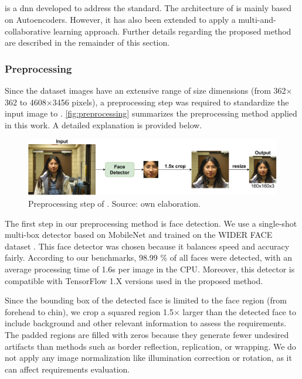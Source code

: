 \subsection{\methodname}
 
\methodname is a \acl{dnn} developed to address the \icao standard. The architecture of \methodname is mainly based on Autoencoders. However, it has also been extended to apply a multi-and-collaborative learning approach. Further details regarding the proposed method are described in the remainder of this section. 
 
\subsubsection{Preprocessing} \label{sec:preprocessing}
 
Since the \adhoc dataset images have an extensive range of size dimensions (from 362$\times$362 to 4608$\times$3456 pixels), a preprocessing step was required to standardize the input image to \methodname. \autoref{fig:preprocessing} summarizes the preprocessing method applied in this work. A detailed explanation is provided below.
 
\begin{figure}[tb]
\centering
\includegraphics[width=\linewidth]{images/icaonet/preprocessing.pdf}
\caption{Preprocessing step of \methodname. Source: own elaboration.}
\label{fig:preprocessing}
\end{figure}
 
The first step in our preprocessing method is face detection. We use a single-shot multi-box detector based on MobileNet \citep{yeephycho} and trained on the WIDER FACE dataset \citep{yang2016wider}. This face detector was chosen because it balances speed and accuracy fairly. According to our benchmarks, 98.99 \% of all faces were detected, with an average processing time of 1.6s per image in the CPU. Moreover, this detector is compatible with TensorFlow 1.X versions used in the proposed method. 
 
Since the bounding box of the detected face is limited to the face region (from forehead to chin), we crop a squared region 1.5$\times$ larger than the detected face to include background and other relevant information to assess the requirements. The padded regions are filled with zeros because they generate fewer undesired artifacts than methods such as border reflection, replication, or wrapping. We do not apply any image normalization like illumination correction or rotation, as it can affect requirements evaluation. 
 
